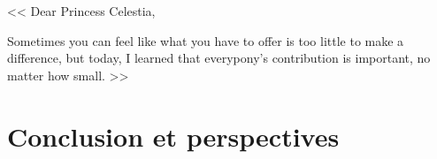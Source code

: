 \begin{savequote}[.5\textwidth]
<< Dear Princess Celestia,

\quad Sometimes you can feel like what you have to offer is too little to make a difference, but today, I learned that everypony's contribution is important, no matter how small. >>
\end{savequote}

\chapter{Conclusion et perspectives}\label{chap:conclusion}
\chaptertoc




